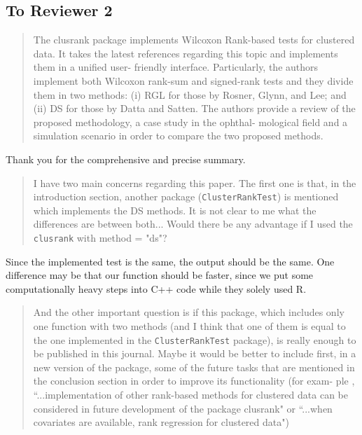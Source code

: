 \documentclass[12pt]{article}
\newenvironment{comment}%
{\begin{quotation}\noindent\small\it\ignorespaces%
  }{\end{quotation}}
\begin{document}
\subsection*{To Reviewer 2}

\begin{comment}
The clusrank package implements Wilcoxon Rank-based tests for clustered
data. It takes the latest references regarding this topic and implements
them in a unified user- friendly interface. Particularly, the authors
implement both Wilcoxon rank-sum and signed-rank tests and they divide
them in two methods: (i) RGL for those by Rosner, Glynn, and Lee; and (ii)
DS for those by Datta and Satten.  The authors provide a review of the
proposed methodology, a case study in the ophthal- mological field and a
simulation scenario in order to compare the two proposed methods.
\end{comment}

Thank you for the comprehensive and precise summary.

\begin{comment}
I have two main concerns regarding this paper. The first one is that, in
the introduction section, another package (\texttt{ClusterRankTest}) is
mentioned which implements the DS methods. It is not clear to me what the
differences are between both... Would there be any advantage if I used the
\texttt{clusrank} with method = "ds"?
\end{comment}

Since the implemented test is the same, the output should be the
same. One difference may be that our function should be faster, since we put
some computationally heavy steps into C++ code while they solely used R.

\begin{comment}
And the other important question is if this package, which includes only one function
with two methods (and I think that one of them is equal to the one implemented in the
\texttt{ClusterRankTest} package), is really enough to be published in this journal. Maybe it
would be better to include first, in a new version of the package, some of the future tasks
that are mentioned in the conclusion section in order to improve its functionality (for exam-
ple , ``...implementation of other rank-based methods for clustered data can be considered
in future development of the package clusrank" or ``...when covariates are available, rank
regression for clustered data")
\end{comment}
\end{document}
